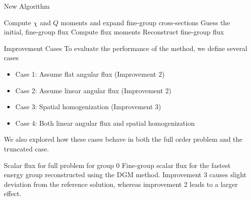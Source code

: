 \documentclass[final]{beamer}
\begin{document}
\begin{frame}{}
\begin{columns}[t]
        
        \begin{column}{.32\linewidth}
            \begin{block}{New Algorithm}
                \DontPrintSemicolon
                \begin{algorithm}[H]
                    Compute $\chi$ and $Q$ moments and expand fine-group cross-sections\;
                    Guess the initial, fine-group flux\;
                    Compute flux moments\;
                    Reconstruct fine-group flux\;
                \end{algorithm}
            \end{block}
            \vspace{0.1eX}
            \begin{block}{Improvement Cases}
                To evaluate the performance of the method, we define several cases
                \begin{itemize}
                    \item Case 1: Assume flat angular flux (Improvement 2)
                    \item Case 2: Assume linear angular flux (Improvement 2)
                    \item Case 3: Spatial homogenization (Improvement 3)
                    \item Case 4: Both linear angular flux and spatial homogenization
                \end{itemize}
                We also explored how these cases behave in both the full order problem and the truncated case.
            \end{block}
            \vspace{0.1eX}
            \begin{block}{Scalar flux for full problem for group 0}
                Fine-group scalar flux for the fastest energy group reconstructed using the DGM method.
                Improvement 3 causes slight deviation from the reference solution, whereas improvement 2 leads to a larger effect.
                \begin{figure}[htb]

\end{figure}
\end{block}
\end{column}
\end{columns}
\end{frame}
\end{document}
